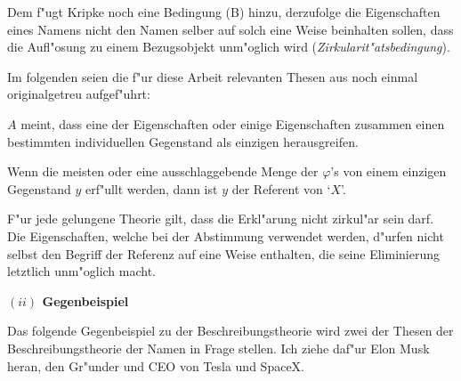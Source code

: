 \documentclass[a4paper, emulatestandardclasses, 12pt]{scrartcl}
\begin{document}
\begin{onehalfspace}
Dem f"ugt Kripke noch eine Bedingung (B) hinzu, derzufolge die Eigenschaften eines Namens nicht den Namen selber auf solch eine Weise beinhalten sollen, dass die Aufl"osung zu einem Bezugsobjekt unm"oglich wird (\emph{Zirkularit"atsbedingung}).\newpage

\noindent Im folgenden seien die f"ur diese Arbeit relevanten Thesen aus \citep{begriffundgegenstand} noch einmal originalgetreu aufgef"uhrt:\vspace{5mm}

\begin{addmargin}[.08\linewidth]{.08\linewidth}%
\footnotesize
\begin{description}[leftmargin=!,labelwidth=\widthof{\bfseries (B)}]
    \item[(2)] $A$ meint, dass eine der Eigenschaften oder einige Eigenschaften zusammen einen bestimmten individuellen Gegenstand als einzigen herausgreifen.
    \item[(3)] Wenn die meisten oder eine ausschlaggebende Menge der $\varphi$'s von einem einzigen Gegenstand $y$ erf"ullt werden, dann ist $y$ der Referent von `$X$'.
    \item[(B)] F"ur jede gelungene Theorie gilt, dass die Erkl"arung nicht zirkul"ar sein darf. Die Eigenschaften, welche bei der Abstimmung verwendet werden, d"urfen nicht selbst den Begriff der Referenz auf eine Weise enthalten, die seine Eliminierung letztlich unm"oglich macht.
\end{description}
\end{addmargin}
\normalsize

\vspace{5mm}
\noindent\textbf{$(ii)$ Gegenbeispiel}	

\noindent Das folgende Gegenbeispiel zu der Beschreibungstheorie wird zwei der Thesen der Beschreibungstheorie der Namen in Frage stellen. Ich ziehe daf"ur Elon Musk heran, den Gr"under und CEO von Tesla und SpaceX. 


\end{onehalfspace}
\end{document}
